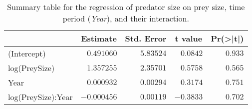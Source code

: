 \begin{table}[!htbp]
\caption{Summary table for the regression of predator size on prey size,
  time period (\emph{Year}), and their interaction.\label{tab:SizeYint}} 
\begin{center}
\begin{tabular}{lrrrr}
\hline
\multicolumn{1}{l}{}&\multicolumn{1}{c}{Estimate}&\multicolumn{1}{c}{Std. Error}&\multicolumn{1}{c}{t value}&\multicolumn{1}{c}{Pr(\textgreater |t|)}\tabularnewline
\hline
(Intercept)&$ 0.491060$&$5.83524$&$ 0.0842$&$0.933$\tabularnewline
log(PreySize)&$ 1.357255$&$2.35701$&$ 0.5758$&$0.565$\tabularnewline
Year&$ 0.000932$&$0.00294$&$ 0.3174$&$0.751$\tabularnewline
log(PreySize):Year&$-0.000456$&$0.00119$&$-0.3833$&$0.702$\tabularnewline
\hline
\end{tabular}\end{center}
\end{table}

